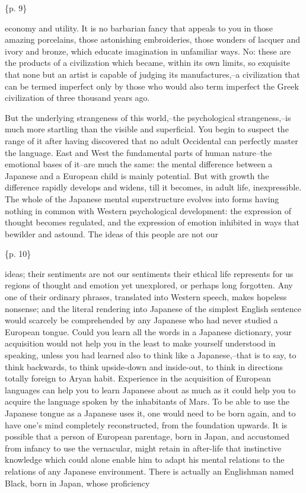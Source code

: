 \{p. 9\}

economy and utility. It is no barbarian fancy that appeals to you in those amazing porcelains, those astonishing embroideries, those wonders of lacquer and ivory and bronze, which educate imagination in unfamiliar ways. No: these are the products of a civilization which became, within its own limits, so exquisite that none but an artist is capable of judging its manufactures,--a civilization that can be termed imperfect only by those who would also term imperfect the Greek civilization of three thousand years ago.



But the underlying strangeness of this world,--the psychological strangeness,--is much more startling than the visible and superficial. You begin to suspect the range of it after having discovered that no adult Occidental can perfectly master the language. East and West the fundamental parts of human nature--the emotional bases of it--are much the same: the mental difference between a Japanese and a European child is mainly potential. But with growth the difference rapidly develops and widens, till it becomes, in adult life, inexpressible. The whole of the Japanese mental superstructure evolves into forms having nothing in common with Western psychological development: the expression of thought becomes regulated, and the expression of emotion inhibited in ways that bewilder and astound. The ideas of this people are not our

\{p. 10\}

ideas; their sentiments are not our sentiments their ethical life represents for us regions of thought and emotion yet unexplored, or perhaps long forgotten. Any one of their ordinary phrases, translated into Western speech, makes hopeless nonsense; and the literal rendering into Japanese of the simplest English sentence would scarcely be comprehended by any Japanese who had never studied a European tongue. Could you learn all the words in a Japanese dictionary, your acquisition would not help you in the least to make yourself understood in speaking, unless you had learned also to think like a Japanese,--that is to say, to think backwards, to think upside-down and inside-out, to think in directions totally foreign to Aryan habit. Experience in the acquisition of European languages can help you to learn Japanese about as much as it could help you to acquire the language spoken by the inhabitants of Mars. To be able to use the Japanese tongue as a Japanese uses it, one would need to be born again, and to have one's mind completely reconstructed, from the foundation upwards. It is possible that a person of European parentage, born in Japan, and accustomed from infancy to use the vernacular, might retain in after-life that instinctive knowledge which could alone enable him to adapt his mental relations to the relations of any Japanese environment. There is actually an Englishman named Black, born in Japan, whose proficiency

